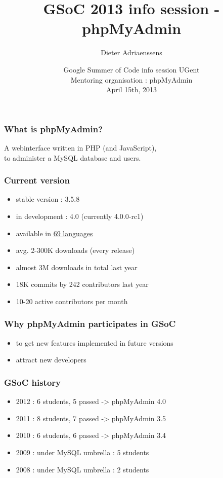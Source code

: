 \documentclass[14pt]{beamer}
\title{GSoC 2013 info session - phpMyAdmin}
\author{Dieter Adriaenssens}
\institute[phpMyAdmin]{phpMyAdmin developer}
\date[15Apr2013]{Google Summer of Code info session UGent\\
Mentoring organisation : phpMyAdmin\\
April 15th, 2013}
\begin{document}
  \begin{frame}
  \titlepage
  \end{frame}
  \begin{frame}
    \frametitle{What is phpMyAdmin?}
      A webinterface written in PHP (and JavaScript),\\
      to administer a MySQL database and users.
  \end{frame}
  \begin{frame}
    \frametitle{Current version}
    \begin{itemize}
      \item stable version : 3.5.8
      \item in development : 4.0 (currently 4.0.0-rc1)
      \item available in \href{http://www.phpmyadmin.net/home\_page/translations.php}{69 languages}
      \item avg. 2-300K downloads (every release)
      \item almost 3M downloads in total last year
      \item 18K commits by 242 contributors last year
      \item 10-20 active contributors per month
    \end{itemize}
  \end{frame}
  \begin{frame}
    \frametitle{Why phpMyAdmin participates in GSoC}
    \begin{itemize}
      \item to get new features implemented in future versions
      \item attract new developers
    \end{itemize}
  \end{frame}
  \begin{frame}
    \frametitle{GSoC history}
    \begin{itemize}
      \item 2012 : 6 students, 5 passed -> phpMyAdmin 4.0
      \item 2011 : 8 students, 7 passed -> phpMyAdmin 3.5
      \item 2010 : 6 students, 6 passed -> phpMyAdmin 3.4
      \item 2009 : under MySQL umbrella : 5 students
      \item 2008 : under MySQL umbrella : 2 students
    \end{itemize}
  \end{frame}
\end{document}
